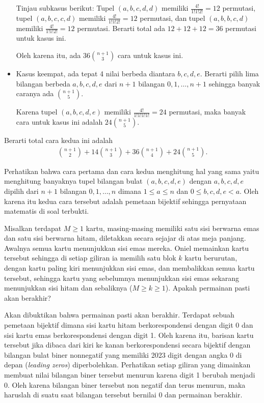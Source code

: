 \documentclass[11pt]{scrartcl}
\begin{document}
\begin{soaljawab}
\begin{solusi}
\begin{itemize}
		Tinjau subkasus berikut: Tupel $(a,b,c,d,d)$ memiliki $\frac{4!}{1!1!2!}=12$ permutasi, tupel $(a,b,c,c,d)$ memiliki $\frac{4!}{1!1!2!}=12$ permutasi, dan tupel $(a,b,b,c,d)$ memiliki $\frac{4!}{1!1!2!}=12$ permutasi. Berarti total ada $12+12+12=36$ permutasi untuk kasus ini.
				
		Oleh karena itu, ada $36{n+1 \choose 3}$ cara untuk kasus ini.
		
		\item Kasus keempat, ada tepat 4 nilai berbeda diantara $b,c,d,e$. Berarti pilih lima bilangan berbeda $a,b,c,d,e$ dari $n+1$ bilangan $0,1,\dots,n+1$ sehingga banyak caranya ada ${n+1 \choose 5}$.
		
		Karena tupel $(a,b,c,d,e)$ memiliki $\frac{4!}{1!1!1!1!}=24$ permutasi, maka banyak cara untuk kasus ini adalah $24{n+1 \choose 5}$.
	
		\end{itemize}
		Berarti total cara kedua ini adalah 
		\begin{align*}
		{n+1 \choose 2} + 14{n+1 \choose 3}+36{n+1 \choose 4}+24{n+1 \choose 5}.
		\end{align*}

    Perhatikan bahwa cara pertama dan cara kedua menghitung hal yang sama  yaitu menghitung banyaknya tupel bilangan bulat $(a,b,c,d,e)$ dengan $a,b,c,d,e$ dipilih dari $n+1$ bilangan $0,1,\dots,n$ dimana $1 \le a \le n$ dan $0 \le b,c,d,e < a$. Oleh karena itu kedua cara tersebut adalah pemetaan bijektif sehingga pernyataan matematis di soal terbukti.
  
    \end{solusi}
\end{soaljawab}

\begin{soaljawab}
Misalkan terdapat $M \ge 1$ kartu, masing-masing memiliki satu sisi berwarna emas dan satu sisi berwarna hitam, diletakkan secara sejajar di atas meja panjang. Awalnya semua kartu menunjukkan sisi emas mereka. Oniel memainkan kartu tersebut sehingga di setiap giliran ia memilih satu blok $k$ kartu berurutan, dengan kartu paling kiri menunjukkan sisi emas, dan membalikkan semua kartu tersebut, sehingga kartu yang sebelumnya menunjukkan sisi emas sekarang menunjukkan sisi hitam dan sebaliknya ($M \ge k \ge 1$). Apakah permainan pasti akan berakhir?
    \begin{solusi}
    Akan dibuktikan bahwa permainan pasti akan berakhir. Terdapat sebuah pemetaan bijektif dimana sisi kartu hitam berkorespondensi dengan digit 0 dan sisi kartu emas berkorespondensi dengan digit 1. Oleh karena itu, barisan kartu tersebut jika dibaca dari kiri ke kanan berkorespondensi secara bijektif dengan bilangan bulat biner nonnegatif yang memiliki 2023 digit dengan angka 0 di depan (\textit{leading zeros}) diperbolehkan. Perhatikan setiap giliran yang dimainkan membuat nilai bilangan biner tersebut menurun karena digit 1 berubah menjadi 0. Oleh karena bilangan biner tersebut non negatif dan terus menurun, maka haruslah di suatu saat bilangan tersebut bernilai 0 dan permainan berakhir.
    \end{solusi}
\end{soaljawab}
\end{document}
